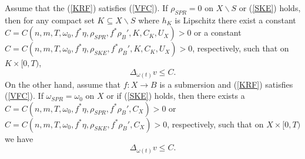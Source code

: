 \documentclass[10pt,a4paper]{amsart}
\begin{document}
\begin{proposition}
Assume that the (\ref{KRF}) satisfies (\ref{VFC}). If $\rho_{SPR} = 0$ on $X \backslash S$ or (\ref{SKE}) holds, then for any compact set $K \subseteq X \backslash S$ where $h_K$ is Lipschitz there exist a constant $C = C(n,m,T,\omega_0,f^*\eta,\rho_{SPR},f^*\rho_B',K,C_K,U_X) > 0$ or a constant $C = C(n,m,T,\omega_0,f^*\eta,\rho_{SKE},f^*\rho_B',K,C_K,U_X) > 0$, respectively, such that on $K \times [0,T)$,
\begin{equation*}
    \Delta_{\omega(t)} v \leq C.
\end{equation*}
On the other hand, assume that $f:X \to B$ is a submersion and (\ref{KRF}) satisfies (\ref{VFC}). If $\omega_{SPR} = \omega_{0}$ on $X$ or if (\ref{SKE}) holds, then there exists a $C = C(n,m,T,\omega_0, f^*\eta,\rho_{SPR},f^*\rho_B',C_X) > 0$ or $C = C(n,m,T,\omega_0,f^*\eta,\rho_{SKE},f^*\rho_B',C_X) > 0$, respectively, such that on $X \times [0,T)$ we have
\begin{equation*}
    \Delta_{\omega(t)} v \leq C.
\end{equation*}
\end{proposition}
\end{document}
